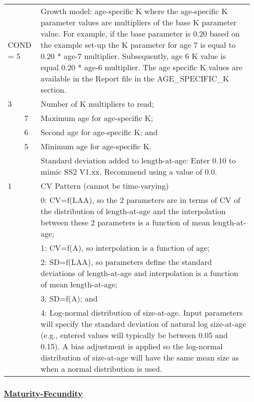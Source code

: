 \begin{longtable}{p{0.5cm} p{2cm} p{12.5cm}}
	\multicolumn{2}{l}{COND = 5} & Growth model: age-specific K where the age-specific K parameter values are multipliers of the base K parameter value. For example, if the base parameter is 0.20 based on the example set-up the K parameter for age 7 is equal to 0.20 * age-7 multiplier. Subsequently, age 6 K value is equal 0.20 * age-6 multiplier. The age specific K values are available in the Report file in the AGE\_SPECIFIC\_K section. \\
	3 & & Number of K multipliers to read; \\
	& 7 & Maximum age for age-specific K; \\
	& 6 & Second age for age-specific K; and \\
	& 5 & Minimum age for age-specific K. \Bstrut\\
	\hline

	\Tstrut 0 & & Standard deviation added to length-at-age: Enter 0.10 to mimic SS2 V1.xx. Recommend using a value of 0.0. \Bstrut\\
	\hline

	1 & & CV Pattern (cannot be time-varying) \Tstrut\\
	  & & 0: CV=f(LAA), so the 2 parameters are in terms of CV of the distribution of length-at-age and the interpolation between these 2 parameters is a function of mean length-at-age; \\
	  & & 1: CV=f(A), so interpolation is a function of age; \\
	  & & 2: SD=f(LAA), so parameters define the standard deviations of length-at-age and interpolation is a function of mean length-at-age; \\
	  & & 3: SD=f(A); and \\
	  & & 4: Log-normal distribution of size-at-age. Input parameters will specify the standard deviation of natural log size-at-age (e.g., entered values will typically be between 0.05 and 0.15). A bias adjustment is applied so the log-normal distribution of size-at-age will have the same mean size as when a normal distribution is used. \Bstrut\\
	\hline
\end{longtable}

\hypertarget{Mat-Fec}{}
\subsubsection[Maturity-Fecundity]{\protect\hyperlink{Mat-Fec}{Maturity-Fecundity}}

